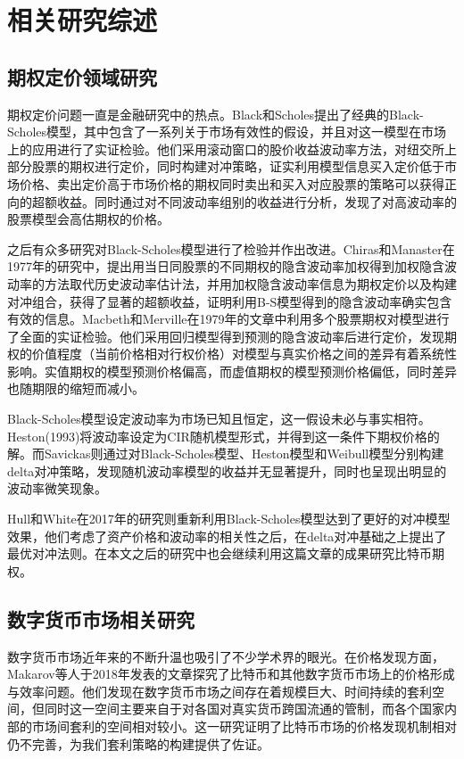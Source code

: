 \chapter{相关研究综述}
\section{期权定价领域研究}
\par{
期权定价问题一直是金融研究中的热点。Black和Scholes提出了经典的Black-Scholes模型\cite{10.2307/1831029}，其中包含了一系列关于市场有效性的假设，并且对这一模型在市场上的应用进行了实证检验\cite{J-1972}。他们采用滚动窗口的股价收益波动率方法，对纽交所上部分股票的期权进行定价，同时构建对冲策略，证实利用模型信息买入定价低于市场价格、卖出定价高于市场价格的期权同时卖出和买入对应股票的策略可以获得正向的超额收益。同时通过对不同波动率组别的收益进行分析，发现了对高波动率的股票模型会高估期权的价格。}
\par{
之后有众多研究对Black-Scholes模型进行了检验并作出改进。Chiras和Manaster在1977年的研究中，提出用当日同股票的不同期权的隐含波动率加权得到加权隐含波动率的方法取代历史波动率估计法，并用加权隐含波动率信息为期权定价以及构建对冲组合，获得了显著的超额收益，证明利用B-S模型得到的隐含波动率确实包含有效的信息\cite{CHIRAS1978213}。Macbeth和Merville在1979年的文章中利用多个股票期权对模型进行了全面的实证检验\cite{Jame-1979}。他们采用回归模型得到预测的隐含波动率后进行定价，发现期权的价值程度（当前价格相对行权价格）对模型与真实价格之间的差异有着系统性影响。实值期权的模型预测价格偏高，而虚值期权的模型预测价格偏低，同时差异也随期限的缩短而减小。
}
\par{Black-Scholes模型设定波动率为市场已知且恒定，这一假设未必与事实相符。Heston(1993)将波动率设定为CIR随机模型形式，并得到这一条件下期权价格的解\cite{10.1093/rfs/6.2.327}。而Savickas则通过对Black-Scholes模型、Heston模型和Weibull模型分别构建delta对冲策略，发现随机波动率模型的收益并无显著提升，同时也呈现出明显的波动率微笑现象\cite{Rober-2005}。}
\par{
    Hull和White在2017年的研究则重新利用Black-Scholes模型达到了更好的对冲模型效果，他们考虑了资产价格和波动率的相关性之后，在delta对冲基础之上提出了最优对冲法则\cite{Hull-2017}。在本文之后的研究中也会继续利用这篇文章的成果研究比特币期权。
}
\section{数字货币市场相关研究}
\par{数字货币市场近年来的不断升温也吸引了不少学术界的眼光。在价格发现方面，Makarov等人于2018年发表的文章探究了比特币和其他数字货币市场上的价格形成与效率问题\cite{Makarov-2018}。他们发现在数字货币市场之间存在着规模巨大、时间持续的套利空间，但同时这一空间主要来自于对各国对真实货币跨国流通的管制，而各个国家内部的市场间套利的空间相对较小。这一研究证明了比特币市场的价格发现机制相对仍不完善，为我们套利策略的构建提供了佐证。
}
